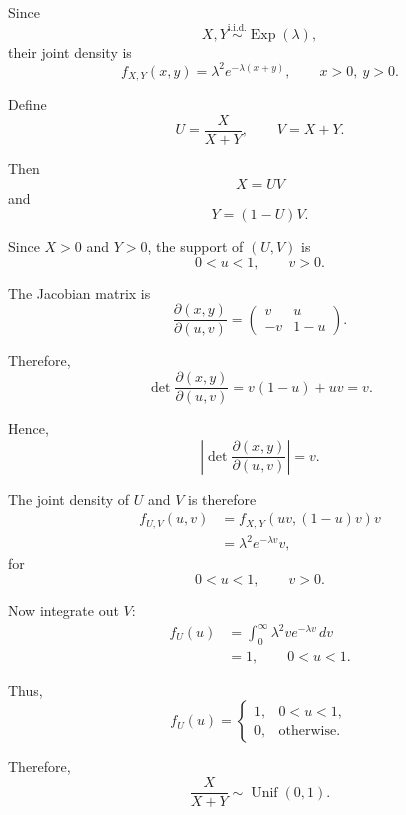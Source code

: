 \documentclass[11pt]{article}
\newenvironment{solution}{
    \par
    \begin{tcolorbox}[
        colback=white,
        colframe=uwgold,
        boxrule=0.7pt,
        arc=2mm,
        left=3mm,
        right=3mm,
        top=2mm,
        bottom=2mm,
        breakable,
        before skip=0.5em,
        after skip=1em,
        title=\textbf{Solution},
        coltitle=uwpurple,
        fonttitle=\bfseries
    ]
}{
    \end{tcolorbox}
}
\begin{document}
\begin{solution}

Since
\[
X,Y\overset{\text{i.i.d.}}{\sim}\operatorname{Exp}(\lambda),
\]
their joint density is
\[
f_{X,Y}(x,y)
=
\lambda^2e^{-\lambda(x+y)},
\qquad x>0,\ y>0.
\]

Define
\[
U=\frac{X}{X+Y},
\qquad
V=X+Y.
\]

Then
\[
X=UV
\]
and
\[
Y=(1-U)V.
\]

Since \(X>0\) and \(Y>0\), the support of \((U,V)\) is
\[
0<u<1,
\qquad
v>0.
\]

The Jacobian matrix is
\[
\frac{\partial(x,y)}{\partial(u,v)}
=
\begin{pmatrix}
v & u\\
-v & 1-u
\end{pmatrix}.
\]

Therefore,
\[
\det
\frac{\partial(x,y)}{\partial(u,v)}
=
v(1-u)+uv
=
v.
\]

Hence,
\[
\left|
\det
\frac{\partial(x,y)}{\partial(u,v)}
\right|
=
v.
\]

The joint density of \(U\) and \(V\) is therefore
\[
\begin{aligned}
f_{U,V}(u,v)
&=
f_{X,Y}(uv,(1-u)v)v\\
&=
\lambda^2e^{-\lambda v}v,
\end{aligned}
\]
for
\[
0<u<1,\qquad v>0.
\]

Now integrate out \(V\):
\[
\begin{aligned}
f_U(u)
&=
\int_0^\infty
\lambda^2ve^{-\lambda v}\,dv\\
&=
1,
\qquad 0<u<1.
\end{aligned}
\]

Thus,
\[
f_U(u)
=
\begin{cases}
1, & 0<u<1,\\
0, & \text{otherwise}.
\end{cases}
\]

Therefore,
\[
\frac{X}{X+Y}
\sim
\operatorname{Unif}(0,1).
\]

\end{solution}


\end{document}

